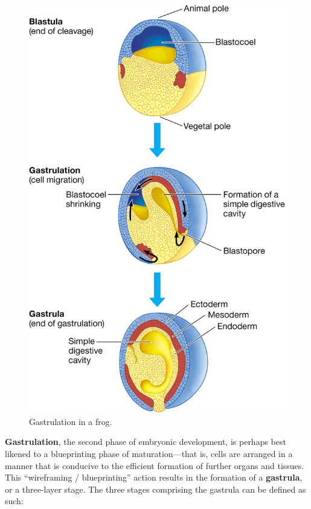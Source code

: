 \documentclass{article}
\begin{document}
\begin{figure}
	\includegraphics[width=\linewidth]{frog_gastrulation.png}
	\caption{Gastrulation in a frog.}
\end{figure}

\textbf{Gastrulation}, the second phase of embryonic development, is perhaps
best likened to a blueprinting phase of maturation---that is, cells are
arranged in a manner that is conducive to the efficient formation of further
organs and tissues. This ``wireframing / blueprinting'' action results in the
formation of a \textbf{gastrula}, or a three-layer stage. The three stages
comprising the gastrula can be defined as such:
\end{document}
